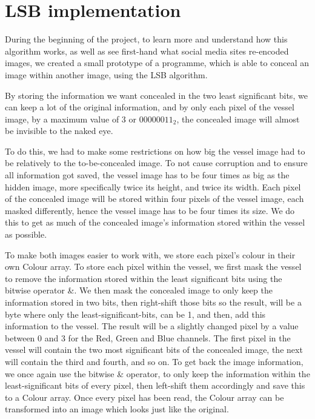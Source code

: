 \section{LSB implementation}
\label{sec:lsb-implementation}
During the beginning of the project, to learn more and understand how this algorithm works, as well as see first-hand what social media sites re-encoded images, we created a small prototype of a programme, which is able to conceal an image within another image, using the LSB algorithm. 

By storing the information we want concealed in the two least significant bits, we can keep a lot of the original information, and by only each pixel of the vessel image, by a maximum value of 3 or $00000011_2$, the concealed image will almost be invisible to the naked eye.

To do this, we had to make some restrictions on how big the vessel image had to be relatively to the to-be-concealed image. To not cause corruption and to ensure all information got saved, the vessel image has to be four times as big as the hidden image, more specifically twice its height, and twice its width. Each pixel of the concealed image will be stored within four pixels of the vessel image, each masked differently, hence the vessel image has to be four times its size. We do this to get as much of the concealed image's information stored within the vessel as possible.

To make both images easier to work with, we store each pixel's colour in their own Colour array. To store each pixel within the vessel, we first mask the vessel to remove the information stored within the least significant bits using the bitwise operator \&. We then mask the concealed image to only keep the information stored in two bits, then right-shift those bits so the result, will be a byte where only the least-significant-bits, can be 1, and then, add this information to the vessel. The result will be a slightly changed pixel by a value between 0 and 3 for the Red, Green and Blue channels. The first pixel in the vessel will contain the two most significant bits of the concealed image, the next will contain the third and fourth, and so on. To get back the image information, we once again use the bitwise \& operator, to only keep the information within the least-significant bits of every pixel, then left-shift them accordingly and save this to a Colour array. Once every pixel has been read, the Colour array can be transformed into an image which looks just like the original.

